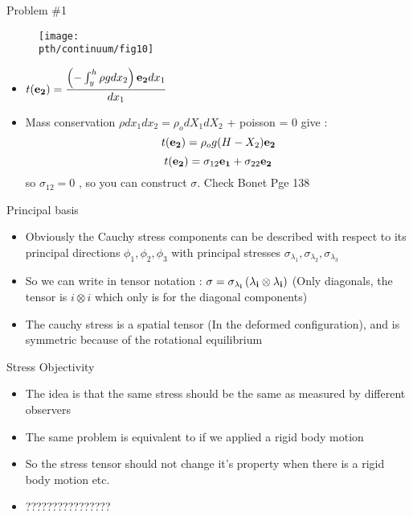 	\begin{frame}{Problem \#1}
		\begin{figure}
			\centering
			\texttt{[image: \\pth/continuum/fig10]}
		\end{figure}
	\begin{itemize}
		\item $t(\mathbf{e_2}) = \dfrac{\left(-\int_{y}^{h} \rho g dx_2 \right)\mathbf{e_2}dx_1}{dx_1}$
		\item Mass conservation $\rho dx_1dx_2 = \rho_o dX_1dX_2$ + poisson = 0 give :
		\begin{equation}
		t(\mathbf{e_2}) = \rho_o g (H- X_2) \mathbf{e_2}
		\end{equation}
		\begin{equation}
		t(\mathbf{e_2}) = \sigma_{12}\mathbf{e_1} + \sigma_{22}\mathbf{e_2}
		\end{equation}
		so $\sigma_{12} = 0$ , so you can construct $\sigma$. Check Bonet Pge 138
	\end{itemize}
	\end{frame}

	\begin{frame}{Principal basis}
		\begin{itemize}
			\item Obviously the Cauchy stress components can be described with respect to its principal directions $\phi_1,\phi_2,\phi_3$ with principal stresses $\sigma_{\lambda_1},\sigma_{\lambda_2},\sigma_{\lambda_3}$
			\item So we can write in tensor notation :
			$\mathbf{\sigma = \sigma_{\lambda_i} \left(\lambda_i \otimes \lambda_i \right)}$
			(Only diagonals, the tensor is $i \otimes i$ which only is for the diagonal components)
			\item The cauchy stress is a spatial tensor (In the deformed configuration), and is symmetric because of the rotational equilibrium
		\end{itemize}
	\end{frame}

	\begin{frame}{Stress Objectivity}
		\begin{itemize}
			\item The idea is that the same stress should be the same as measured by different observers
			\item The same problem is equivalent to if we applied a rigid body motion
			\item So the stress tensor should not change it's property when there is a rigid body motion etc.
			\item ???????????????? 
			
		\end{itemize}
	\end{frame}

